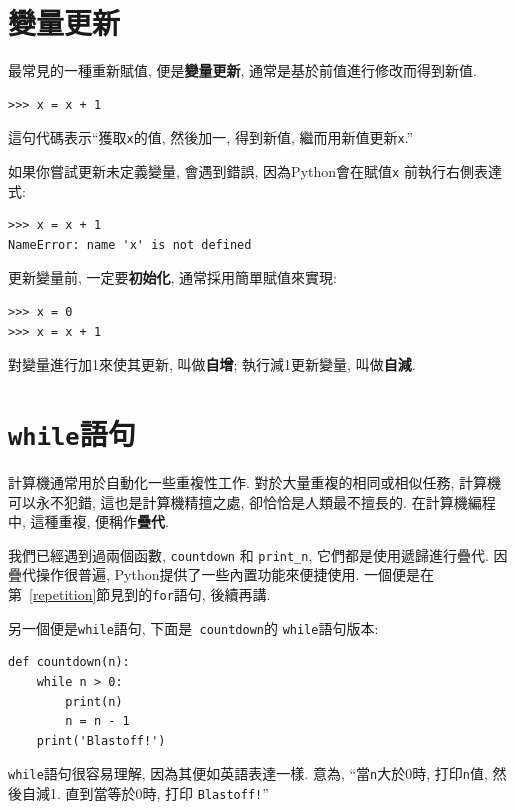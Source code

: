 \documentclass[10pt]{book}
\begin{document}
\section{變量更新}
\label{update}


最常見的一種重新賦值, 便是{\bf 變量更新},
通常是基於前值進行修改而得到新值. 

\begin{verbatim}
>>> x = x + 1
\end{verbatim}
%
這句代碼表示``獲取{\tt x}的值, 然後加一, 得到新值, 繼而用新值更新{\tt x}.'' 

如果你嘗試更新未定義變量, 會遇到錯誤, 
因為Python會在賦值{\tt x} 前執行右側表達式:

\begin{verbatim}
>>> x = x + 1
NameError: name 'x' is not defined
\end{verbatim}
%
更新變量前, 一定要{\bf 初始化}, 通常採用簡單賦值來實現:

\begin{verbatim}
>>> x = 0
>>> x = x + 1
\end{verbatim}
%
對變量進行加1來使其更新, 叫做{\bf 自增};
執行減1更新變量, 叫做{\bf 自減}. 


\section{{\tt while}語句}
計算機通常用於自動化一些重複性工作. 
對於大量重複的相同或相似任務, 計算機可以永不犯錯, 
這也是計算機精擅之處, 卻恰恰是人類最不擅長的. 
在計算機編程中, 這種重複, 便稱作{\bf 疊代}.

我們已經遇到過兩個函數,  {\tt countdown} 和
\verb"print_n",  它們都是使用遞歸進行疊代. 
因疊代操作很普遍, Python提供了一些內置功能來便捷使用. 
一個便是在第~\ref{repetition}節見到的{\tt for}語句, 後續再講. 

另一個便是{\tt while}語句, 下面是{\tt
countdown}的 {\tt while}語句版本:

\begin{verbatim}
def countdown(n):
    while n > 0:
        print(n)
        n = n - 1
    print('Blastoff!')
\end{verbatim}
%
{\tt while}語句很容易理解, 因為其便如英語表達一樣. 
意為, ``當{\tt n}大於0時, 打印{\tt n}值, 然後自減1.
直到當等於0時, 打印 {\tt Blastoff!}''
\end{document}
